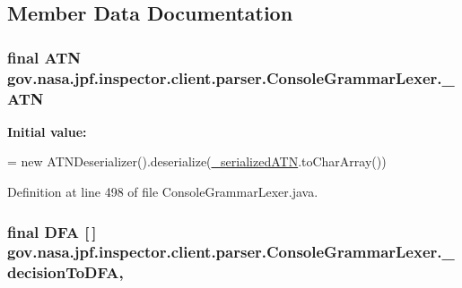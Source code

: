 \subsection{Member Data Documentation}
\subsubsection[{\texorpdfstring{\+\_\+\+A\+TN}{_ATN}}]{\setlength{\rightskip}{0pt plus 5cm}final A\+TN gov.\+nasa.\+jpf.\+inspector.\+client.\+parser.\+Console\+Grammar\+Lexer.\+\_\+\+A\+TN\hspace{0.3cm}{\ttfamily [static]}}\hypertarget{classgov_1_1nasa_1_1jpf_1_1inspector_1_1client_1_1parser_1_1_console_grammar_lexer_afc31564da9d737d603885c8f9003d7d7}{}\label{classgov_1_1nasa_1_1jpf_1_1inspector_1_1client_1_1parser_1_1_console_grammar_lexer_afc31564da9d737d603885c8f9003d7d7}
{\bfseries Initial value\+:}
\begin{DoxyCode}
=
    \textcolor{keyword}{new} ATNDeserializer().deserialize(\hyperlink{classgov_1_1nasa_1_1jpf_1_1inspector_1_1client_1_1parser_1_1_console_grammar_lexer_ac2e2a7afc4d13c41b53ceddf4661e2c9}{\_serializedATN}.toCharArray())
\end{DoxyCode}


Definition at line 498 of file Console\+Grammar\+Lexer.\+java.

\subsubsection[{\texorpdfstring{\+\_\+decision\+To\+D\+FA}{_decisionToDFA}}]{\setlength{\rightskip}{0pt plus 5cm}final D\+FA \mbox{[}$\,$\mbox{]} gov.\+nasa.\+jpf.\+inspector.\+client.\+parser.\+Console\+Grammar\+Lexer.\+\_\+decision\+To\+D\+FA\hspace{0.3cm}{\ttfamily [static]}, {\ttfamily [protected]}}\hypertarget{classgov_1_1nasa_1_1jpf_1_1inspector_1_1client_1_1parser_1_1_console_grammar_lexer_af8ac1b0c7a93a94478c786791e9dfb87}{}\label{classgov_1_1nasa_1_1jpf_1_1inspector_1_1client_1_1parser_1_1_console_grammar_lexer_af8ac1b0c7a93a94478c786791e9dfb87}


